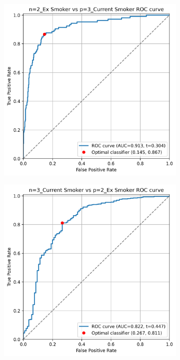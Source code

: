 \documentclass[draft]{article} %
\begin{document}
\begin{figure}[p]
    \begin{subfigure}{0.46\linewidth}
        \centering
        \includegraphics[width=\linewidth]{cohort2/test_2v3_roc.png}
    \end{subfigure}
    \hspace{4mm}
    \begin{subfigure}{0.46\linewidth}
        \centering
        \includegraphics[width=\linewidth]{cohort2/test_3v2_roc.png}
    \end{subfigure}


\end{figure}
\end{document}
